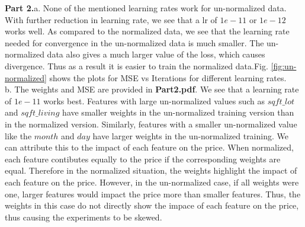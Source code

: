 \documentclass{article}
\begin{document}
\textbf{Part 2.}a. None of the mentioned learning rates work for un-normalized data. With further reduction in learning rate, we see that a lr of $1e-11$ or $1e-12$ works well. As compared to the normalized data, we see that the learning rate needed for convergence in the un-normalized data is much smaller. The un-normalized data also gives a much larger value of the loss, which causes divergence. Thus as a result it is easier to train the normalized data.Fig. \ref{fig:un-normalized} shows the plots for MSE vs Iterations for different learning rates.\\

b. The weights and MSE are provided in \textbf{Part2.pdf}. We see that a learning rate of $1e-11$ works best. Features with large un-normalized values such as $sqft\_lot$ and $sqft\_living$ have smaller weights in the un-normalized training version than in the normalized version. Similarly, features with a smaller un-normalized value like the $month$ and $day$ have larger weights in the un-normalized training. We can attribute this to the impact of each feature on the price. When normalized, each feature contibutes equally to the price if the corresponding weights are equal. Therefore in the normalized situation, the weights highlight the impact of each feature on the price. However, in the un-normalized case, if all weights were one, larger features would impact the price more than smaller features. Thus, the weights in this case do not directly show the impace of each feature on the price, thus causing the experiments to be skewed.\\
\end{document}
